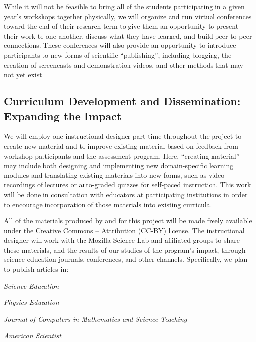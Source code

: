 \documentclass{proposalnsf}
\newlength{\up}
\begin{document}
While it will not be feasible to bring all of the students
participating in a given year's workshops together physically, we will
organize and run virtual conferences toward the end of their research
term to give them an opportunity to present their work to one another,
discuss what they have learned, and build peer-to-peer connections.
These conferences will also provide an opportunity to introduce
participants to new forms of scientific ``publishing'', including
blogging, the creation of screencasts and demonstration videos, and
other methods that may not yet exist.

\subsection{Curriculum Development and Dissemination: Expanding the Impact}

We will employ one instructional designer part-time throughout the
project to create new material and to improve existing material based
on feedback from workshop participants and the assessment program.
Here, ``creating material'' may include both designing and
implementing new domain-specific learning modules and translating
existing materials into new forms, such as video recordings of
lectures or auto-graded quizzes for self-paced instruction.  This work
will be done in consultation with educators at participating
institutions in order to encourage incorporation of those materials
into existing curricula.

All of the materials produced by and for this project will be made
freely available under the Creative Commons -- Attribution (CC-BY)
license.  The instructional designer will work with the Mozilla
Science Lab and affiliated groups to share these materials, and the
results of our studies of the program's impact, through science
education journals, conferences, and other channels. Specifically, we
plan to publish articles in:

\begin{compactitem}

\item
  \emph{Science Education}

\item
  \emph{Physics Education}

\item
  \emph{Journal of Computers in Mathematics and Science Teaching}

\item
  \emph{American Scientist}

\end{compactitem}
\end{document}
